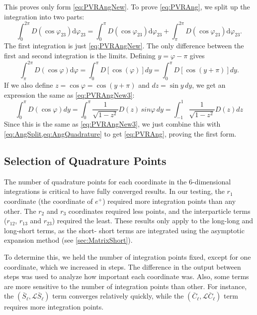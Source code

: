 \documentclass[Dissertation.tex]{subfiles}
\begin{document}
This proves only form \cref{eq:PVRAngNew}. To prove \cref{eq:PVRAng}, we split up the integration into two parts:
\begin{equation}
\int_0^{2\pi } D\left( {\cos {\varphi_{23}}} \right){\textrm{d}}{\varphi_{23}} = \int_0^\pi  D\left( {\cos {\varphi_{23}}} \right){\textrm{d}}{\varphi_{23}} + \int _\pi ^{2\pi } D\left( {\cos {\varphi _{23}}} \right){\textrm{d}}{\varphi _{23}}.
\label{eq:AngSplit}
\end{equation}
The first integration is just \cref{eq:PVRAngNew}. The only difference between the first and second integration is the limits. Defining $y = \varphi - \pi$ gives
\begin{equation}
\int _\pi ^{2\pi } D\left( {\cos {\varphi}} \right){\textrm{d}}{\varphi} = \int_0^\pi D\left[\cos(\varphi)\right] dy = \int_0^\pi D\left[\cos(y+\pi)\right] dy.
\end{equation}
If we also define $z = \cos \varphi = \cos(y+\pi)$ and $dz = \sin y \,dy$, we get an expression the same as \cref{eq:PVRAngNew3}:
\begin{equation}
\int_0^\pi D\left(\cos\varphi\right) dy = \int_0^\pi \frac{1}{\sqrt{1-z^2}} D(z)\, sin\varphi\, dy = \int_{-1}^1 \frac{1}{\sqrt{1-z^2}} D(z) dz
\end{equation}
Since this is the same as \cref{eq:PVRAngNew3}, we just combine this with \cref{eq:AngSplit,eq:AngQuadrature} to get \cref{eq:PVRAng}, proving the first form.



\subsection{Selection of Quadrature Points}
\label{sec:SelQuadPoints}


The number of quadrature points for each coordinate in the 6-dimensional 
integrations is critical to have fully converged results. In our testing, the 
$r_1$ coordinate (the coordinate of $e^+$) required more integration points 
than any other. The $r_2$ and $r_3$ coordinates required less points, and the 
interparticle terms ($r_{12}$, $r_{13}$ and $r_{23}$) required the least. 
These results only apply to the long-long and long-short terms, as the short-
short terms are integrated using the asymptotic expansion method (see
\cref{sec:MatrixShort}).

To determine this, we held the number of integration points fixed, except for 
one coordinate, which we increased in steps. The difference in the output 
between steps was used to analyze how important each coordinate was. Also, 
some terms are more sensitive to the number of integration points than other. 
For instance, the $(\bar{S}_\ell,\mathcal{L} \bar{S}_\ell)$ term converges 
relatively quickly, while the $(\bar{C}_\ell,\mathcal{L} \bar{C}_\ell)$ 
term requires more integration points.
\end{document}
